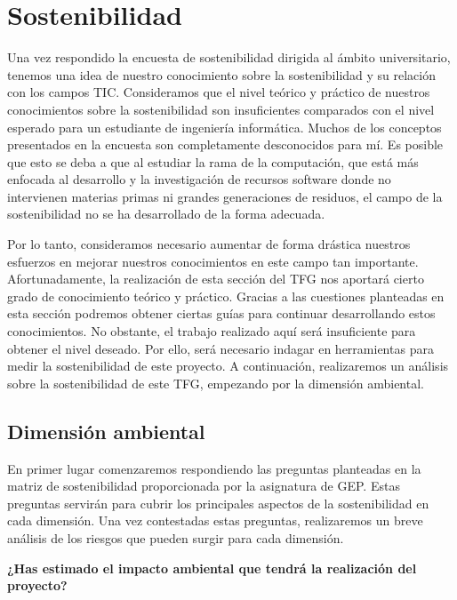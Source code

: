 \chapter{Sostenibilidad}
Una vez respondido la encuesta de sostenibilidad dirigida al ámbito universitario, tenemos una idea de nuestro conocimiento sobre la sostenibilidad y su relación con los campos TIC. Consideramos que el nivel teórico y práctico de nuestros conocimientos sobre la sostenibilidad son insuficientes comparados con el nivel esperado para un estudiante de ingeniería informática. Muchos de los conceptos presentados en la encuesta son completamente desconocidos para mí. Es posible que esto se deba a que al estudiar la rama de la computación, que está más enfocada al desarrollo y la investigación de recursos software donde no intervienen materias primas ni grandes generaciones de residuos, el campo de la sostenibilidad no se ha desarrollado de la forma adecuada.   

Por lo tanto, consideramos necesario aumentar de forma drástica nuestros esfuerzos en mejorar nuestros conocimientos en este campo tan importante. Afortunadamente, la realización de esta sección del TFG nos aportará cierto grado de conocimiento teórico y práctico. Gracias a las cuestiones planteadas en esta sección podremos obtener ciertas guías para continuar desarrollando estos conocimientos. No obstante, el trabajo realizado aquí será insuficiente para obtener el nivel deseado. Por ello, será necesario indagar en herramientas para medir la sostenibilidad de este proyecto. A continuación, realizaremos un análisis sobre la sostenibilidad de este TFG, empezando por la dimensión ambiental.

\section{Dimensión ambiental}
En primer lugar comenzaremos respondiendo las preguntas planteadas en la matriz de sostenibilidad  proporcionada por la asignatura de GEP. Estas preguntas servirán para cubrir los principales aspectos de la sostenibilidad en cada dimensión. Una vez contestadas estas preguntas, realizaremos un breve análisis de los riesgos que pueden surgir para cada dimensión.  

\textbf{¿Has estimado el impacto ambiental que tendrá la realización del proyecto?}  

